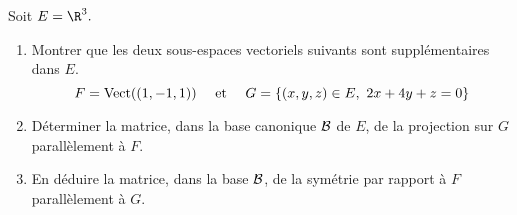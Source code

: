 \documentclass[a4paper,10pt]{report}
\begin{document}
\begin{Exa} Soit $E=\R^3.$

\begin{enumerate}

\item Montrer que les deux sous-espaces vectoriels suivants sont
suppl\'ementaires dans $E.$
$$F=\hbox{Vect}((1,-1,1))\quad\hbox{ et }\quad G=\{(x,y,z)\in
E,\ 2x+4y+z=0\}$$

\item D\'eterminer la matrice, dans la base canonique ${\cal B}$
de $E$, de la projection sur $G$ parallèlement à $F.$

\item En d\'eduire la matrice, dans la base ${\cal B}$, de la
sym\'etrie par rapport \`a $F$ parallèlement à $G.$
\end{enumerate}
\end{Exa} 

\corr 
\end{document}
